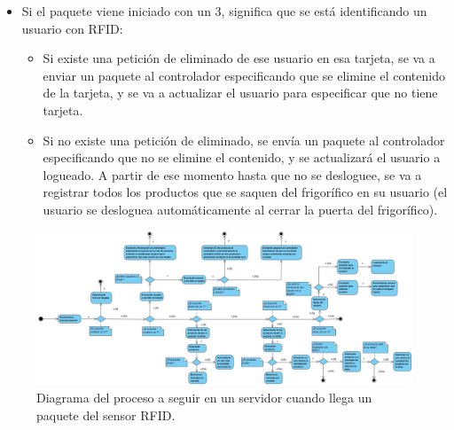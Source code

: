 \begin{itemize}
\begin{itemize}
        \item Si el paquete viene iniciado con un 3, significa que se está identificando un usuario con RFID:
        \begin{itemize}
            \item Si existe una petición de eliminado de ese usuario en esa tarjeta, se va a enviar un paquete al controlador especificando que se elimine el contenido de la tarjeta, y se va a actualizar el usuario para especificar que no tiene tarjeta.
            \item Si no existe una petición de eliminado, se envía un paquete al controlador especificando que no se elimine el contenido, y se actualizará el usuario a logueado. A partir de ese momento hasta que no se desloguee, se va a registrar todos los productos que se saquen del frigorífico en su usuario (el usuario se desloguea automáticamente al cerrar la puerta del frigorífico).
        \end{itemize}
    \end{itemize}
\end{itemize}

\begin{landscape}
    \vspace*{7em}
    \begin{figure}[h]
        \centering\includegraphics[width=\hsize]{capitulos/capitulo7/diagramaRFIDServer.jpg}
        \caption{Diagrama del proceso a seguir en un servidor cuando llega un paquete del sensor RFID.}
        \label{img_gantt}
    \end{figure}
\end{landscape}